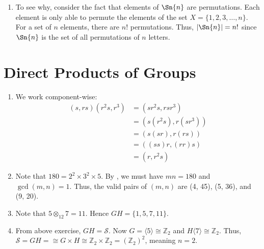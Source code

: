 \begin{enumerate}
    \item To see why, consider the fact that elements of $\Sn{n}$ are permutations. Each element is only able to permute the elements of the set $X = \{1, 2, 3, \dots, n\}$. For a set of $n$ elements, there are $n!$ permutations. Thus, $|\Sn{n}| = n!$ since $\Sn{n}$ is the set of all permutations of $n$ letters.
\end{enumerate}

\section{Direct Products of Groups}
\begin{enumerate}
    \item We work component-wise:
    \begin{align*}
        (s, rs)(r^2s, r^3) &= (sr^2s, rsr^3)\\
        &= (s(r^2s), r(sr^3))\\
        &= (s(sr), r(rs))\\
        &= ((ss)r, (rr)s)\\
        &= (r, r^2s)
    \end{align*}

    \item Note that $180 = 2^2 \times 3^2 \times 5$. By , we must have $mn = 180$ and $\gcd(m, n) = 1$. Thus, the valid pairs of $(m,n)$ are (4, 45), (5, 36), and (9, 20).

    \item Note that $5 \otimes_{12} 7 = 11$. Hence $GH = \{1, 5, 7, 11\}$.

    \item From above exercise, $GH = \mathcal{S}$. Now $G = \langle 5 \rangle \cong \mathbb{Z}_2$ and $H \langle 7 \rangle \cong \mathbb{Z}_2$. Thus, $\mathcal{S} = GH = \cong G \times H \cong \mathbb{Z}_2 \times \mathbb{Z}_2 = (\mathbb{Z}_2)^2$, meaning $n = 2$.
\end{enumerate}

